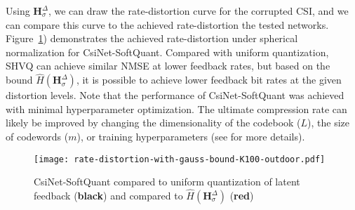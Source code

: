 Using $\mathbf H_\sigma^\Delta$, we can draw the rate-distortion curve for the corrupted CSI, and we can compare this curve to the achieved rate-distortion the tested networks. Figure~\ref{fig:csinet-soft-bound}) demonstrates the achieved rate-distortion under spherical normalization for CsiNet-SoftQuant. Compared with uniform quantization, SHVQ can achieve similar NMSE at lower feedback rates, but based on the bound $\hat H(\mathbf H_\sigma^\Delta)$, it is possible to achieve lower feedback bit rates at the given distortion levels. Note that the performance of CsiNet-SoftQuant was achieved with minimal hyperparameter optimization. The ultimate compression rate can likely be improved by changing the dimensionality of the codebook ($L$), the size of codewords ($m$), or training hyperparameters (see \cite{ref:Agustsson2017SoftToHard} for more details).  
\begin{figure}[!hbtp] \centering 
	\centering
	\texttt{[image: rate-distortion-with-gauss-bound-K100-outdoor.pdf]}
	\caption{CsiNet-SoftQuant compared to uniform quantization of latent feedback (\textbf{black}) and compared to $\hat H(\mathbf H_\sigma^\Delta)$ (\textbf{{\color{red}red}})} 
	\label{fig:csinet-soft-bound} 
\end{figure}
